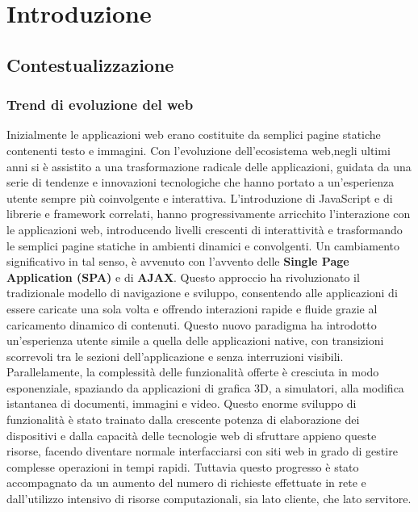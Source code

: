 \chapter{Introduzione}
\label{chap:1}

\section{Contestualizzazione}
\label{sec:Contestualizzazione}

\subsection{Trend di evoluzione del web}
Inizialmente le applicazioni web erano costituite da semplici pagine statiche contenenti testo e immagini.
Con l'evoluzione dell'ecosistema web,negli ultimi anni si è assistito a una trasformazione radicale delle applicazioni, guidata da una serie di tendenze e innovazioni tecnologiche che hanno portato a un'esperienza utente sempre più coinvolgente e interattiva.
L'introduzione di JavaScript e di librerie e framework correlati, hanno progressivamente arricchito l'interazione con le applicazioni web, introducendo livelli crescenti di interattività e trasformando le semplici pagine statiche in ambienti dinamici e convolgenti. 
Un cambiamento significativo in tal senso, è avvenuto con l'avvento delle \textbf{Single Page Application (SPA)} e di \textbf{AJAX}.
Questo approccio ha rivoluzionato il tradizionale modello di navigazione e sviluppo, consentendo alle applicazioni di essere caricate una sola volta e offrendo interazioni rapide e fluide grazie al caricamento dinamico di contenuti. Questo nuovo paradigma ha introdotto un'esperienza utente simile a quella delle applicazioni native, con transizioni scorrevoli tra le sezioni dell'applicazione e senza interruzioni visibili.
\\Parallelamente, la complessità delle funzionalità offerte è cresciuta in modo esponenziale, spaziando da applicazioni di grafica 3D, a simulatori, alla modifica istantanea di documenti, immagini e video.
Questo enorme sviluppo di funzionalità è stato trainato dalla crescente potenza di elaborazione dei dispositivi e dalla capacità delle tecnologie web di sfruttare appieno queste risorse, facendo diventare normale interfacciarsi con siti web in grado di gestire complesse operazioni in tempi rapidi.
Tuttavia questo progresso è stato accompagnato da un aumento del numero di richieste effettuate in rete e dall'utilizzo intensivo di risorse computazionali, sia lato cliente, che lato servitore.
